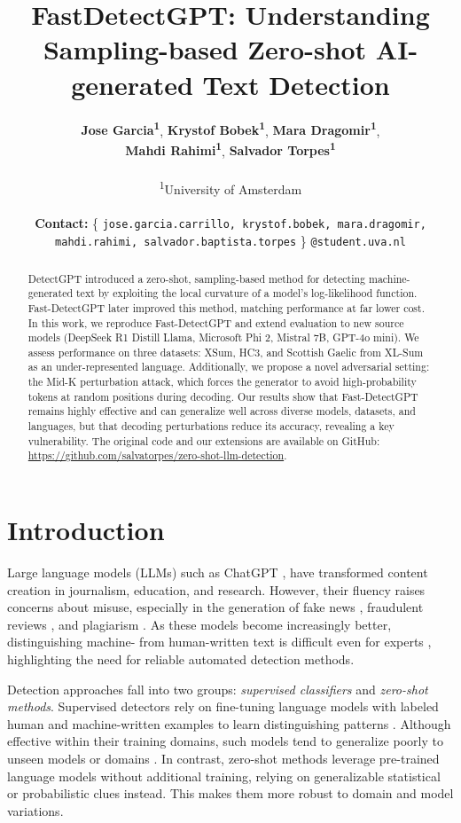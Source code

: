 \documentclass[11pt]{article}
\title{FastDetectGPT: Understanding Sampling-based Zero-shot AI-generated Text Detection}
\author{
  \textbf{Jose Garcia\textsuperscript{1}},
  \textbf{Krystof Bobek\textsuperscript{1}},
  \textbf{Mara Dragomir\textsuperscript{1}}, \\
  \textbf{Mahdi Rahimi\textsuperscript{1}},
  \textbf{Salvador Torpes\textsuperscript{1}}
\\
\\
  \textsuperscript{1}University of Amsterdam
\\
\\
  \textbf{Contact:} \{
    \texttt{jose.garcia.carrillo, krystof.bobek, mara.dragomir,} \\
    \texttt{mahdi.rahimi, salvador.baptista.torpes} \}
    \texttt{@student.uva.nl}
}
\begin{document}
\maketitle

\begin{abstract}
  DetectGPT introduced a zero-shot, sampling-based method for detecting machine-generated text by exploiting the local curvature of a model's log-likelihood function. Fast-DetectGPT later improved this method, matching performance at far lower cost. In this work, we reproduce Fast-DetectGPT and extend evaluation to new source models (DeepSeek R1 Distill Llama, Microsoft Phi 2, Mistral 7B, GPT-4o mini). We assess performance on three datasets: XSum, HC3, and Scottish Gaelic from XL-Sum as an under-represented language. Additionally, we propose a novel adversarial setting: the Mid-K perturbation attack, which forces the generator to avoid high-probability tokens at random positions during decoding. Our results show that Fast-DetectGPT remains highly effective and can generalize well across diverse models, datasets, and languages, but that decoding perturbations reduce its accuracy, revealing a key vulnerability. The original code and our extensions are available on GitHub: \url{https://github.com/salvatorpes/zero-shot-llm-detection}.
\end{abstract}


\section{Introduction}

Large language models (LLMs) such as ChatGPT \cite{GPT3}, have transformed content creation in journalism, education, and research. However, their fluency raises concerns about misuse, especially in the generation of fake news \cite{ahmed2021detectingfakenewsusing}, fraudulent reviews \cite{adelani2019generatingsentimentpreservingfakeonline}, and plagiarism \cite{Lee_2023}. As these models become increasingly better, distinguishing machine- from human-written text is difficult even for experts \cite{shahid2022areyouacyborg}, highlighting the need for reliable automated detection methods.

Detection approaches fall into two groups: \textit{supervised classifiers} and \textit{zero-shot methods}. Supervised detectors rely on fine-tuning language models with labeled human and machine-written examples to learn distinguishing patterns \cite{mitrovic2023chatgpthumandetectexplain}. Although effective within their training domains, such models tend to generalize poorly to unseen models or domains \cite{bakhtin2019realfakelearningdiscriminate}. In contrast, zero-shot methods \cite{su2023detectllm} leverage pre-trained language models without additional training, relying on generalizable statistical or probabilistic clues instead. This makes them more robust to domain and model variations.
\end{document}
